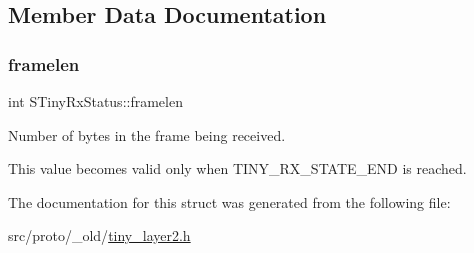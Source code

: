 \subsection{Member Data Documentation}
\mbox{\label{structSTinyRxStatus_ad9f6055b8e74f10894c48ff2247f51c4}} 
\subsubsection{\texorpdfstring{framelen}{framelen}}
{\footnotesize\ttfamily int S\+Tiny\+Rx\+Status\+::framelen}



Number of bytes in the frame being received. 

This value becomes valid only when T\+I\+N\+Y\+\_\+\+R\+X\+\_\+\+S\+T\+A\+T\+E\+\_\+\+E\+ND is reached. 

The documentation for this struct was generated from the following file\+:\begin{DoxyCompactItemize}
\item 
src/proto/\+\_\+old/\hyperlink{tiny__layer2_8h}{tiny\+\_\+layer2.\+h}\end{DoxyCompactItemize}
